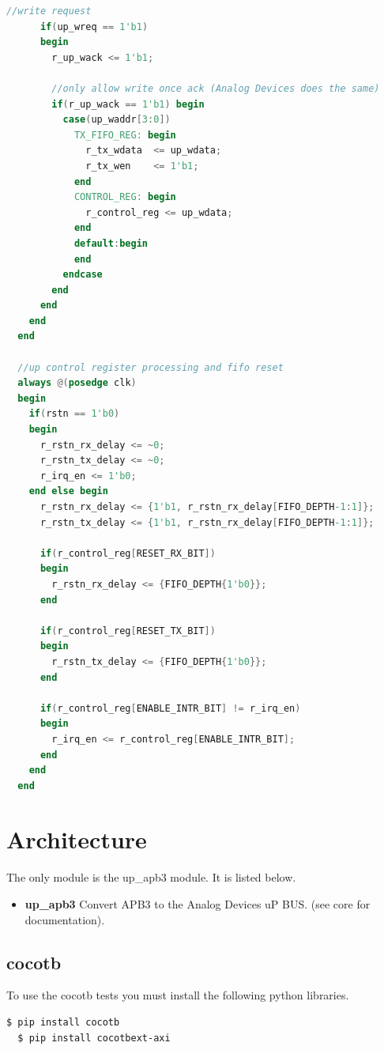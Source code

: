\begin{lstlisting}[language=Verilog]
      //write request
      if(up_wreq == 1'b1)
      begin
        r_up_wack <= 1'b1;

        //only allow write once ack (Analog Devices does the same)
        if(r_up_wack == 1'b1) begin
          case(up_waddr[3:0])
            TX_FIFO_REG: begin
              r_tx_wdata  <= up_wdata;
              r_tx_wen    <= 1'b1;
            end
            CONTROL_REG: begin
              r_control_reg <= up_wdata;
            end
            default:begin
            end
          endcase
        end
      end
    end
  end

  //up control register processing and fifo reset
  always @(posedge clk)
  begin
    if(rstn == 1'b0)
    begin
      r_rstn_rx_delay <= ~0;
      r_rstn_tx_delay <= ~0;
      r_irq_en <= 1'b0;
    end else begin
      r_rstn_rx_delay <= {1'b1, r_rstn_rx_delay[FIFO_DEPTH-1:1]};
      r_rstn_tx_delay <= {1'b1, r_rstn_rx_delay[FIFO_DEPTH-1:1]};

      if(r_control_reg[RESET_RX_BIT])
      begin
        r_rstn_rx_delay <= {FIFO_DEPTH{1'b0}};
      end

      if(r_control_reg[RESET_TX_BIT])
      begin
        r_rstn_tx_delay <= {FIFO_DEPTH{1'b0}};
      end

      if(r_control_reg[ENABLE_INTR_BIT] != r_irq_en)
      begin
        r_irq_en <= r_control_reg[ENABLE_INTR_BIT];
      end
    end
  end
\end{lstlisting}

\section{Architecture}
\par
The only module is the up\_apb3 module. It is listed below.

\begin{itemize}
  \item \textbf{up\_apb3} Convert APB3 to the Analog Devices uP BUS. (see core for documentation).
\end{itemize}

\par\subsection{cocotb}
\par
To use the cocotb tests you must install the following python libraries.
\begin{lstlisting}[language=bash]
  $ pip install cocotb
  $ pip install cocotbext-axi
\end{lstlisting}

